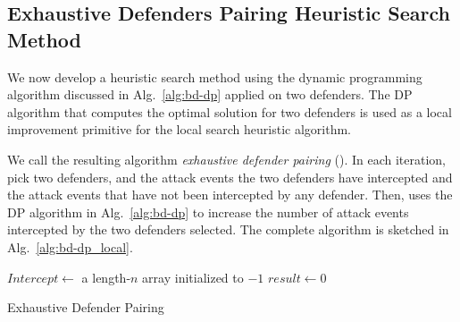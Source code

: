 
\subsection{Exhaustive Defenders Pairing Heuristic Search Method}
\label{sec:bd-dp_local}
We now develop a heuristic search method using the dynamic programming algorithm discussed in Alg.~\ref{alg:bd-dp} 
applied on two defenders.
The DP algorithm that computes the optimal solution for two defenders is used as a local improvement primitive 
for the local search heuristic algorithm. 

We call the resulting algorithm \emph{exhaustive defender pairing} (\ours).  
In each iteration, \ours pick two defenders, and the attack events the two defenders have intercepted and the attack events that have not been intercepted by any defender. 
Then, \ours uses the DP algorithm in Alg.~\ref{alg:bd-dp} to increase the number of attack events intercepted by the two defenders selected. 
The complete algorithm is sketched in Alg.~\ref{alg:bd-dp_local}.

\begin{algorithm}[h]
\DontPrintSemicolon
{}

$Intercept \gets$ a length-$n$ array initialized to $-1$\;
$result\gets 0$\;
\vspace{1mm}
\vspace{1mm}
\caption{Exhaustive Defender Pairing}
\label{alg:bd-dp_local}
\end{algorithm}

